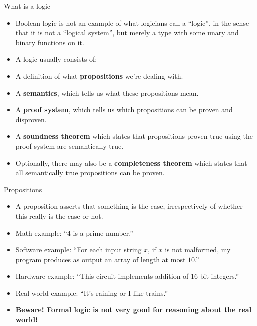 \documentclass{beamer}
\begin{document}
\begin{frame}{What is a logic}
\begin{itemize}
	\item Boolean logic is not an example of what logicians call a ``logic'', in the sense that it is not a ``logical system'', but merely a type with some unary and binary functions on it.
	\item A logic usually consists of:
	\item A definition of what \textbf{propositions} we're dealing with.
	\item A \textbf{semantics}, which tells us what these propositions mean.
	\item A \textbf{proof system}, which tells us which propositions can be proven and disproven.
	\item A \textbf{soundness theorem} which states that propositions proven true using the proof system are semantically true.
	\item Optionally, there may also be a \textbf{completeness theorem} which states that all semantically true propositions can be proven.
\end{itemize}
\end{frame}

\begin{frame}{Propositions}
\begin{itemize}
	\item A proposition asserts that something is the case, irrespectively of whether this really is the case or not.
	\item Math example: ``$4$ is a prime number.''
	\item Software example: ``For each input string $x$, if $x$ is not malformed, my program produces as output an array of length at most $10$.''
	\item Hardware example: ``This circuit implements addition of 16 bit integers.''
	\item Real world example: ``It's raining or I like trains.''
	\item \textbf{Beware! Formal logic is not very good for reasoning about the real world!}
\end{itemize}
\end{frame}
\end{document}
